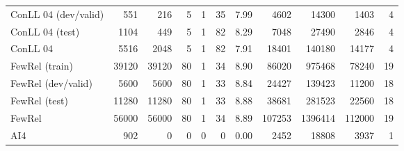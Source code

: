 \begin{tabular}{lrrrrrrrrrr}
 ConLL 04 (dev/valid)  &           551 &             216 &                    5 &                       1 &                      35 &                    7.99 &         4602 &        14300 &           1403 &                 4 \\
 ConLL 04 (test)       &          1104 &             449 &                    5 &                       1 &                      82 &                    8.29 &         7048 &        27490 &           2846 &                 4 \\
 ConLL 04              &          5516 &            2048 &                    5 &                       1 &                      82 &                    7.91 &        18401 &       140180 &          14177 &                 4 \\
 FewRel (train)        &         39120 &           39120 &                   80 &                       1 &                      34 &                    8.90 &        86020 &       975468 &          78240 &                19 \\
 FewRel (dev/valid)    &          5600 &            5600 &                   80 &                       1 &                      33 &                    8.84 &        24427 &       139423 &          11200 &                18 \\
 FewRel (test)         &         11280 &           11280 &                   80 &                       1 &                      33 &                    8.88 &        38681 &       281523 &          22560 &                18 \\
 FewRel                &         56000 &           56000 &                   80 &                       1 &                      34 &                    8.89 &       107253 &      1396414 &         112000 &                19 \\
 AI4                   &           902 &               0 &                    0 &                       0 &                       0 &                    0.00 &         2452 &        18808 &           3937 &                 1 \\
\hline
\end{tabular}